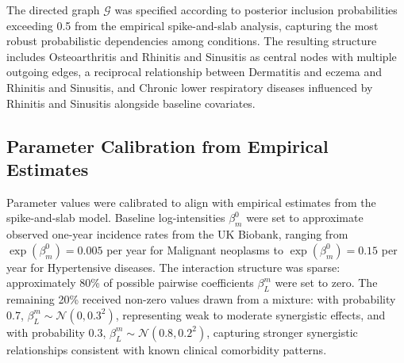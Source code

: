 \documentclass[12pt]{article}
\begin{document}
The directed graph $\mathcal{G}$ was specified according to posterior inclusion probabilities exceeding 0.5 from the empirical spike-and-slab analysis, capturing the most robust probabilistic dependencies among conditions. The resulting structure includes Osteoarthritis and Rhinitis and Sinusitis as central nodes with multiple outgoing edges, a reciprocal relationship between Dermatitis and eczema and Rhinitis and Sinusitis, and Chronic lower respiratory diseases influenced by Rhinitis and Sinusitis alongside baseline covariates.

\subsection{Parameter Calibration from Empirical Estimates}

Parameter values were calibrated to align with empirical estimates from the spike-and-slab model. Baseline log-intensities $\beta^0_m$ were set to approximate observed one-year incidence rates from the UK Biobank, ranging from $\exp(\beta^0_m) = 0.005$ per year for Malignant neoplasms to $\exp(\beta^0_m) = 0.15$ per year for Hypertensive diseases. The interaction structure was sparse: approximately 80\% of possible pairwise coefficients $\beta^m_L$ were set to zero. The remaining 20\% received non-zero values drawn from a mixture: with probability 0.7, $\beta^m_L \sim \mathcal{N}(0, 0.3^2)$, representing weak to moderate synergistic effects, and with probability 0.3, $\beta^m_L \sim \mathcal{N}(0.8, 0.2^2)$, capturing stronger synergistic relationships consistent with known clinical comorbidity patterns.
\end{document}
